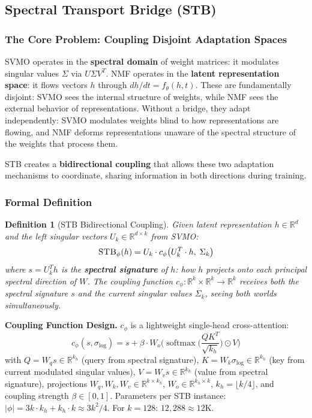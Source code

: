 \documentclass[conference]{IEEEtran}
\newtheorem{definition}[theorem]{Definition}
\newcommand{\stb}{\textsc{STB}}
\newcommand{\RR}{\mathbb{R}}
\newcommand{\softmax}{\operatorname{softmax}}
\begin{document}
\subsection{Spectral Transport Bridge (\stb)}
\label{sec:stb}

\subsubsection{The Core Problem: Coupling Disjoint Adaptation Spaces}

SVMO operates in the \textbf{spectral domain} of weight matrices: it modulates singular values $\Sigma$ via $U\Sigma V^T$. NMF operates in the \textbf{latent representation space}: it flows vectors $h$ through $dh/dt = f_\theta(h, t)$. These are fundamentally disjoint: SVMO sees the internal structure of weights, while NMF sees the external behavior of representations. Without a bridge, they adapt independently: SVMO modulates weights blind to how representations are flowing, and NMF deforms representations unaware of the spectral structure of the weights that process them.

STB creates a \textbf{bidirectional coupling} that allows these two adaptation mechanisms to coordinate, sharing information in both directions during training.

\subsubsection{Formal Definition}

\begin{definition}[\stb{} Bidirectional Coupling]
Given latent representation $h \in \RR^d$ and the left singular vectors $U_k \in \RR^{d \times k}$ from SVMO:
\begin{equation}
\text{\stb}_\phi(h) = U_k \cdot c_\phi\big(U_k^T \cdot h,\; \Sigma_k\big)
\end{equation}
where $s = U_k^T h$ is the \textbf{spectral signature} of $h$: how $h$ projects onto each principal spectral direction of $W$. The coupling function $c_\phi: \RR^k \times \RR^k \to \RR^k$ receives \textit{both} the spectral signature $s$ and the current singular values $\Sigma_k$, seeing both worlds simultaneously.
\end{definition}

\textbf{Coupling Function Design.} $c_\phi$ is a lightweight single-head cross-attention:
\begin{equation}
c_\phi(s, \sigma_{\log}) = s + \beta \cdot W_o\!\big(\softmax\!\big(\frac{Q K^T}{\sqrt{k_h}}\big) \odot V\big)
\end{equation}
with $Q = W_q s \in \RR^{k_h}$ (query from spectral signature), $K = W_k \sigma_{\log} \in \RR^{k_h}$ (key from current modulated singular values), $V = W_v s \in \RR^{k_h}$ (value from spectral signature), projections $W_q, W_k, W_v \in \RR^{k \times k_h}$, $W_o \in \RR^{k_h \times k}$, $k_h = \lfloor k/4 \rfloor$, and coupling strength $\beta \in [0,1]$. Parameters per STB instance: $|\phi| = 3k \cdot k_h + k_h \cdot k \approx 3k^2/4$. For $k=128$: $12{,}288 \approx 12\text{K}$.
\end{document}
